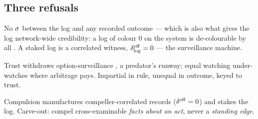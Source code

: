 \documentclass[../main]{subfiles}
\begin{document}
\subsection{Three refusals}
\label{subsec:artifact:refusals}
%
\begin{serieslist}
   No $\sigma$ between the log and any recorded outcome --- which
    is also what gives the log network-wide credibility: a log of colour $0$ on the system is
    de-colourable by all . A staked log is a correlated witness,
    $\effdensity_{\text{log}}=0$ --- the surveillance machine.

   Trust withdraws option-surveillance ,
    a predator's runway; equal watching under-watches where arbitrage pays. Impartial in rule,
    unequal in outcome, keyed to trust.

   Compulsion manufactures compeller-correlated records
    ($\effdensity=0$) and stakes the log. Carve-out: compel cross-examinable \emph{facts about
    an act}, never a \emph{standing edge}.
\end{serieslist}
\end{document}
